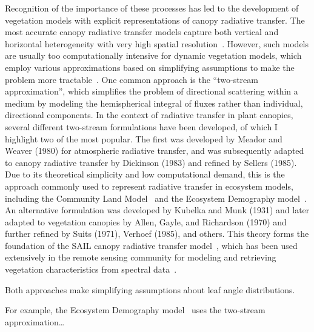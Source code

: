 Recognition of the importance of these processes has led to the development of vegetation models with explicit representations of canopy radiative transfer.
The most accurate canopy radiative transfer models capture both vertical and horizontal heterogeneity with very high spatial resolution~\cite{widlowski_2007_third}.
However, such models are usually too computationally intensive for dynamic vegetation models, which employ various approximations based on simplifying assumptions to make the problem more tractable~\cite{fisher_2017_vegetation}.
One common approach is the ``two-stream approximation'', which simplifies the problem of directional scattering within a medium by modeling the hemispherical integral of fluxes rather than individual, directional components.
In the context of radiative transfer in plant canopies, several different two-stream formulations have been developed, of which I highlight two of the most popular.
The first was developed by Meador and Weaver (1980)\nocite{meador_1980_twostream} for atmospheric radiative transfer, and was subsequently adapted to canopy radiative transfer by Dickinson (1983)\nocite{dickinson_1983_land} and refined by Sellers (1985)\nocite{SELLERS_1985_canopy}.
Due to its theoretical simplicity and low computational demand, this is the approach commonly used to represent radiative transfer in ecosystem models, including the Community Land Model~\cite[CLM,][]{clm45_note} and the Ecosystem Demography model~\cite[ED,][]{Moorcroft_2001_ED,Medvigy_2009_ED2}.
An alternative formulation was developed by Kubelka and Munk (1931)\nocite{kubelka_munk_1931} and later adapted to vegetation canopies by Allen, Gayle, and Richardson (1970)\nocite{allen_1970_plant} and further refined by Suits (1971)\nocite{suits_1971_calculation}, Verhoef (1985)\nocite{verhoef_1984_sail}, and others.
This theory forms the foundation of the SAIL canopy radiative transfer model~\cite{verhoef_1984_sail}, which has been used extensively in the remote sensing community for modeling and retrieving vegetation characteristics from spectral data~\cite{jacquemoud_2009_prosail}.

Both approaches make simplifying assumptions about leaf angle distributions.


For example, the Ecosystem Demography model~\cite[ED2][]{Moorcroft_2001_ED,Medvigy_2009_ED2} uses the two-stream approximation\ldots

